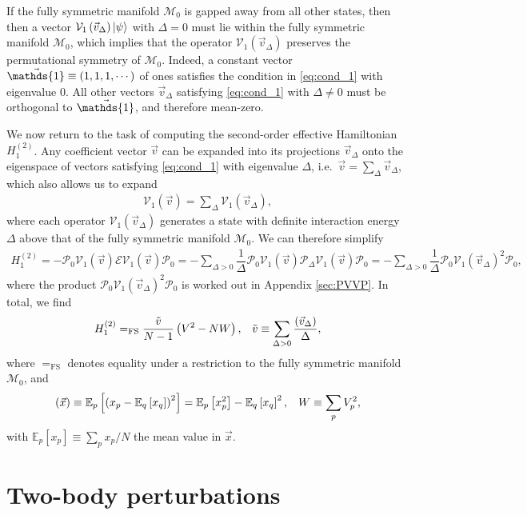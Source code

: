 \documentclass[nofootinbib,notitlepage,11pt]{revtex4-2}
\newcommand{\f}[2]{\dfrac{#1}{#2}} %
\newcommand{\p}[1]{\left(#1\right)} %
\renewcommand{\sp}[1]{\left[#1\right]} %
\renewcommand{\v}{\vec} %
\newcommand{\1}{\mathds{1}}
\newcommand{\E}{\mathcal{E}}
\newcommand{\M}{\mathcal{M}}
\renewcommand{\P}{\mathcal{P}}
\newcommand{\V}{\mathcal{V}}
\newcommand{\EE}{\mathbb{E}}
\newcommand{\FSEQ}{=_{\text{FS}}}
\let\var\relax
\DeclareMathOperator{\var}{var}
\begin{document}
If the fully symmetric manifold $\M_0$ is gapped away from all other
states, then then a vector $\V_1\p{\v v_\Delta}\ket\psi$ with
$\Delta=0$ must lie within the fully symmetric manifold $\M_0$, which
implies that the operator $\V_1\p{\v v_\Delta}$ preserves the
permutational symmetry of $\M_0$.  Indeed, a constant vector
$\v\1\equiv\p{1,1,1,\cdots}$ of ones satisfies the condition in
\eqref{eq:cond_1} with eigenvalue $0$.  All other vectors
$\v v_\Delta$ satisfying \eqref{eq:cond_1} with $\Delta\ne0$ must be
orthogonal to $\v\1$, and therefore mean-zero.

We now return to the task of computing the second-order effective
Hamiltonian $H_1^{(2)}$.  Any coefficient vector $\v v$ can be
expanded into its projections $\v v_\Delta$ onto the eigenspace of
vectors satisfying \eqref{eq:cond_1} with eigenvalue $\Delta$,
i.e.~$\v v = \sum_\Delta \v v_\Delta$, which also allows us to expand
\begin{align}
  \V_1\p{\v v} = \sum_\Delta \V_1\p{\v v_\Delta},
\end{align}
where each operator $\V_1\p{\v v_\Delta}$ generates a state with
definite interaction energy $\Delta$ above that of the fully symmetric
manifold $\M_0$.  We can therefore simplify
\begin{align}
  H_1^{(2)}
  = - \P_0 \V_1\p{\v v} \E \V_1\p{\v v} \P_0
  = - \sum_{\Delta>0} \f1{\Delta}
  \P_0 \V_1\p{\v v} \P_\Delta \V_1\p{\v v} \P_0
  = - \sum_{\Delta>0} \f1{\Delta} \P_0 \V_1\p{\v v_\Delta}^2 \P_0,
\end{align}
where the product $\P_0 \V_1\p{\v v_\Delta}^2 \P_0$ is worked out in
Appendix \ref{sec:PVVP}.  In total, we find
\begin{align}
  H_1^{(2)} \FSEQ \f{\tilde v}{N-1} \p{V^2 - N W},
  &&
  \tilde v \equiv \sum_{\Delta>0} \f{\var\p{\v v_\Delta}}{\Delta},
  \label{eq:H_1_2}
\end{align}
where $\FSEQ$ denotes equality under a restriction to the fully
symmetric manifold $\M_0$, and
\begin{align}
  \var\p{\v x} \equiv \EE_p\sp{\p{x_p-\EE_q\sp{x_q}}^2}
  = \EE_p\sp{x_p^2} - \EE_q\sp{x_q}^2,
  &&
  W \equiv \sum_p V_p^2,
\end{align}
with $\EE_p\sp{x_p}\equiv\sum_px_p/N$ the mean value in $\v x$.

\section{Two-body perturbations}
\end{document}
